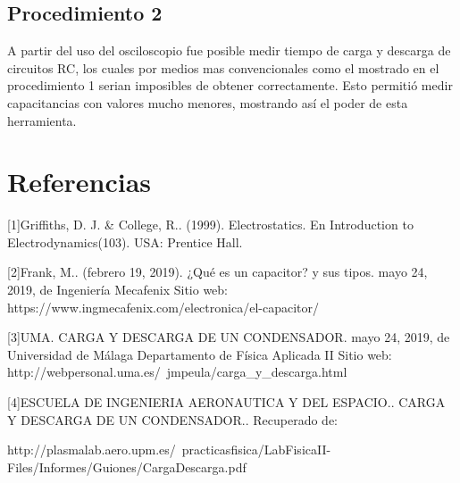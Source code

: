 \documentclass[10pt,letter]{article}
\begin{document}
\begin{multicols}{2}
\subsection{Procedimiento 2}
A partir del  uso del osciloscopio fue posible medir tiempo de carga y descarga de circuitos RC, los cuales por medios mas convencionales como el mostrado en el procedimiento 1 serian imposibles de obtener correctamente. Esto  permitió medir capacitancias con valores mucho menores, mostrando así el poder de esta herramienta. 
 
\end{multicols}

\section*{Referencias}
\parindent=0cm

[1]Griffiths, D. J. \& College, R.. (1999). Electrostatics. En Introduction to Electrodynamics(103). USA: Prentice Hall.

\vspace{0.2cm}

[2]Frank, M.. (febrero 19, 2019). ¿Qué es un capacitor? y sus tipos. mayo 24, 2019, de Ingeniería Mecafenix Sitio web: https://www.ingmecafenix.com/electronica/el-capacitor/

\vspace{0.2cm}

[3]UMA. CARGA Y DESCARGA DE UN CONDENSADOR. mayo 24, 2019, de Universidad de Málaga Departamento de Física Aplicada II Sitio web: http://webpersonal.uma.es/~jmpeula/carga\_y\_descarga.html

\vspace{0.2cm}

[4]ESCUELA DE INGENIERIA AERONAUTICA Y DEL ESPACIO.. CARGA Y DESCARGA DE UN CONDENSADOR.. Recuperado de: 

http://plasmalab.aero.upm.es/~practicasfisica/LabFisicaII-Files/Informes/Guiones/CargaDescarga.pdf
\end{document}
